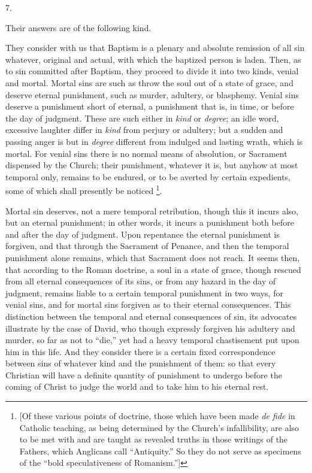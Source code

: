7.

Their answers are of the following kind.

They consider with us that Baptism is a plenary and absolute
remission of all sin whatever, original and actual, with which the
baptized person is laden. Then, as to sin committed after Baptism,
they proceed to divide it into two kinds, venial and mortal. Mortal
sins are such as throw the soul out of a state of grace, and deserve
eternal punishment, such as murder, adultery, or blasphemy. Venial
sins deserve a punishment short of eternal, a punishment that is, in
time, or before the day of judgment. These are such either in \emph{kind}
or \emph{degree}; an idle word, excessive laughter differ in \emph{kind} from
perjury or adultery; but a sudden and passing anger is but in \emph{degree}
different from indulged and lasting wrath, which is mortal. For venial
sins there is no normal means of absolution, or Sacrament dispensed by
the Church; their punishment, whatever it is, but anyhow at most
temporal only, remains to be endured, or to be averted by certain
expedients, some of which shall presently be noticed \footnote{[Of these various points of doctrine,
those which have been made \emph{de fide} in Catholic teaching, as
being determined by the Church's infallibility, are also to be met
with and are taught as revealed truths in those writings of the
Fathers, which Anglicans call ``Antiquity.'' So they do not
serve as specimens of the ``bold speculativeness of
Romanism.'']}.

Mortal sin deserves, not a mere temporal retribution, though this
it incurs also, but an eternal punishment; in other words, it incurs a
punishment both before and after the day of judgment. Upon
repentance the eternal punishment is forgiven, and that through the
Sacrament of Penance, and then the temporal punishment alone remains,
which that Sacrament does not reach. It seems then, that according to
the Roman doctrine, a soul in a state of grace, though rescued from
all eternal consequences of its sins, or from any hazard in the day of
judgment, remains liable to a certain temporal punishment in two ways,
for venial sins, and for mortal sins forgiven as to their eternal
consequences. This distinction between the temporal and eternal
consequences of sin, its advocates illustrate by the case of David,
who though expressly forgiven his adultery and murder, so far as not
to ``die,'' yet had a heavy temporal chastisement put upon him
in this life. And they consider there is a certain fixed
correspondence between sins of whatever kind and the punishment of
them: so that every Christian will have a definite quantity of
punishment to undergo before the coming of Christ to judge the world
and to take him to his eternal rest.

